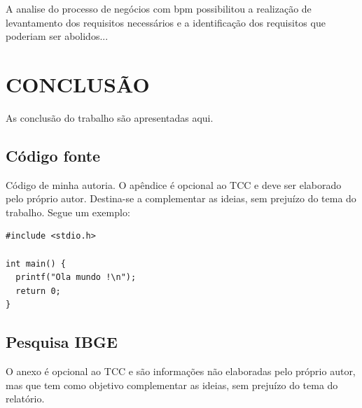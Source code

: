 \documentclass[
	12pt,				%
	openright,			%
	oneside,			%
	a4paper,			%
	chapter=TITLE,		%
	section=TITLE,		%
	english,			%
	french,				%
	spanish,			%
	brazil				%
	]{abntex2}
\begin{document}
A analise do processo de negócios com bpm possibilitou a realização de levantamento dos requisitos necessários e a identificação dos requisitos que poderiam ser abolidos...

\chapter{CONCLUSÃO}

As conclusão do trabalho são apresentadas aqui.





%
%


\begin{apendicesenv}

\chapter{Código fonte}
Código de minha autoria. O apêndice é opcional ao TCC e deve ser elaborado pelo próprio autor. Destina-se a complementar as ideias, sem prejuízo do tema do trabalho. Segue um exemplo:

\scriptsize
\begin{lstlisting}
#include <stdio.h>

int main() {
  printf("Ola mundo !\n");
  return 0;
}
\end{lstlisting}

\end{apendicesenv}

\begin{anexosenv}

\chapter{Pesquisa IBGE}
O anexo é opcional ao TCC e são informações não elaboradas pelo próprio autor, mas que tem como objetivo complementar as ideias, sem prejuízo do tema do relatório.

\end{anexosenv}
\end{document}

